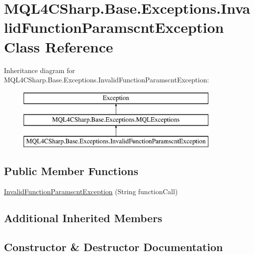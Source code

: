 \hypertarget{class_m_q_l4_c_sharp_1_1_base_1_1_exceptions_1_1_invalid_function_paramscnt_exception}{}\section{M\+Q\+L4\+C\+Sharp.\+Base.\+Exceptions.\+Invalid\+Function\+Paramscnt\+Exception Class Reference}
\label{class_m_q_l4_c_sharp_1_1_base_1_1_exceptions_1_1_invalid_function_paramscnt_exception}
Inheritance diagram for M\+Q\+L4\+C\+Sharp.\+Base.\+Exceptions.\+Invalid\+Function\+Paramscnt\+Exception\+:\begin{figure}[H]
\begin{center}
\leavevmode
\includegraphics[height=3.000000cm]{class_m_q_l4_c_sharp_1_1_base_1_1_exceptions_1_1_invalid_function_paramscnt_exception}
\end{center}
\end{figure}
\subsection*{Public Member Functions}
\begin{DoxyCompactItemize}
\item 
\hyperlink{class_m_q_l4_c_sharp_1_1_base_1_1_exceptions_1_1_invalid_function_paramscnt_exception_ace504ff2430e2e4cbc96d5b490f56482}{Invalid\+Function\+Paramscnt\+Exception} (String function\+Call)
\end{DoxyCompactItemize}
\subsection*{Additional Inherited Members}


\subsection{Constructor \& Destructor Documentation}
